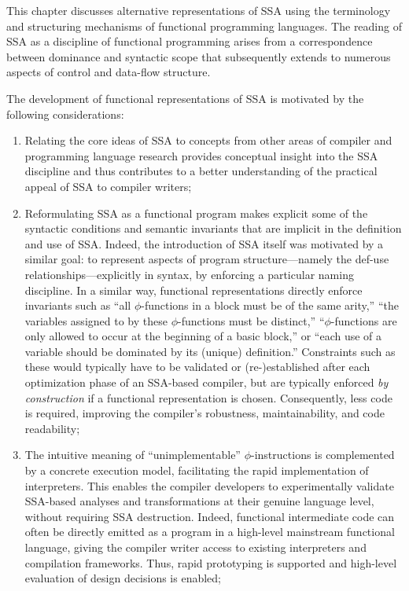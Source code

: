 {%
\label{section:Part1:Semantics:Intro}
\noindent
This chapter discusses alternative representations of SSA using the
terminology and structuring mechanisms of functional programming
languages. The reading of SSA as a discipline of functional
programming arises from a correspondence between dominance and
syntactic scope that subsequently extends to numerous aspects of
control and data-flow structure.

The development of functional representations of SSA is motivated by
the following considerations:

\begin{enumerate}
\item Relating the core ideas of SSA to concepts from other
areas of compiler and programming language research provides
conceptual insight into the SSA discipline and thus contributes to a
better understanding of the practical appeal of SSA to compiler
writers;

\item
Reformulating SSA as a functional program makes explicit some of the
syntactic conditions and semantic invariants that are implicit in
the definition and use of SSA. Indeed, the introduction of
SSA itself was motivated by a similar goal: to represent aspects of
program structure---namely the def-use relationships---explicitly in syntax, 
by enforcing a particular naming discipline. In
a similar way, functional representations directly enforce
invariants such as ``all $\phi$-functions in a block must be of the
same arity,'' ``the variables assigned to by these $\phi$-functions
must be distinct,'' ``$\phi$-functions are only allowed to occur at
the beginning of a basic block,'' or ``each use of a variable should
be dominated by its (unique) definition.'' Constraints such as these
would typically have to be validated or (re-)established after each
optimization phase of an SSA-based compiler, but are typically
enforced \emph{by construction} if a functional representation is
chosen. Consequently, less code is required, improving the
compiler's robustness, maintainability, and code readability;

\item The intuitive meaning of ``unimplementable'' $\phi$-instructions is
comple\-men\-ted by a concrete execution model, facilitating the rapid
implementation of interpreters. This enables the compiler developers to
experimentally validate SSA-based analyses and transformations at
their genuine language level, without requiring SSA
destruction. Indeed, functional intermediate code can often be
directly emitted as a program in a high-level mainstream functional
language, giving the compiler writer access to existing interpreters
and compilation frameworks. Thus, rapid prototyping is supported and
high-level evaluation of design decisions is enabled;


\end{enumerate}}
